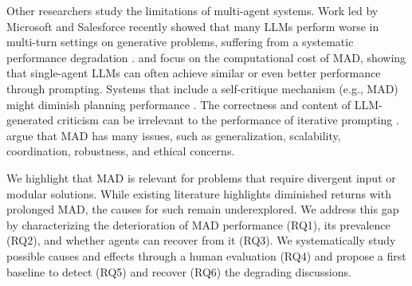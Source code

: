 Other researchers study the limitations of multi-agent systems.
Work led by Microsoft and Salesforce recently showed that many LLMs perform worse in multi-turn settings on generative problems, suffering from a systematic performance degradation \citep{laban2025llmslost}.
\citet{WangWST24} and \citet{zhang2025multiagentdebateanswerquestion} focus on the computational cost of MAD, showing that single-agent LLMs can often achieve similar or even better performance through prompting.
Systems that include a self-critique mechanism (e.g., MAD) might diminish planning performance \citep{ValmeekamMK23a}. 
The correctness and content of LLM-generated criticism can be irrelevant to the performance of iterative prompting \citep{StechlyMK23a}.
\citet{ShahW24} argue that MAD has many issues, such as generalization, scalability, coordination, robustness, and ethical concerns.

We highlight that MAD is relevant for problems that require divergent input or modular solutions.
While existing literature highlights diminished returns with prolonged MAD, the causes for such remain underexplored.
We address this gap by characterizing the deterioration of MAD performance (RQ1), its prevalence (RQ2), and whether agents can recover from it (RQ3).
We systematically study possible causes and effects through a human evaluation (RQ4) and propose a first baseline to detect (RQ5) and recover (RQ6) the degrading discussions.
